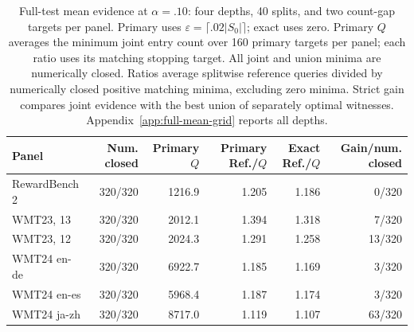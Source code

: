 \begin{table}[t]
\centering\small
\begin{tabular}{lrrrrr}
\toprule
Panel & Num. closed & Primary $Q$ & Primary Ref./$Q$ & Exact Ref./$Q$ & Gain/num. closed \\
\midrule
RewardBench 2 & 320/320 & 1216.9 & 1.205 & 1.186 & 0/320 \\
WMT23, 13 & 320/320 & 2012.1 & 1.394 & 1.318 & 7/320 \\
WMT23, 12 & 320/320 & 2024.3 & 1.291 & 1.258 & 13/320 \\
WMT24 en-de & 320/320 & 6922.7 & 1.185 & 1.169 & 3/320 \\
WMT24 en-es & 320/320 & 5968.4 & 1.187 & 1.174 & 3/320 \\
WMT24 ja-zh & 320/320 & 8717.0 & 1.119 & 1.107 & 63/320 \\
\bottomrule
\end{tabular}
\caption{Full-test mean evidence at $\alpha=.10$: four depths, 40 splits, and two count-gap targets per panel. Primary uses $\varepsilon=\lceil .02|S_0|\rceil$; exact uses zero. Primary $Q$ averages the minimum joint entry count over 160 primary targets per panel; each ratio uses its matching stopping target. All joint and union minima are numerically closed. Ratios average splitwise reference queries divided by numerically closed positive matching minima, excluding zero minima. Strict gain compares joint evidence with the best union of separately optimal witnesses. Appendix~\ref{app:full-mean-grid} reports all depths.}
\label{tab:full-mean-main}
\end{table}
